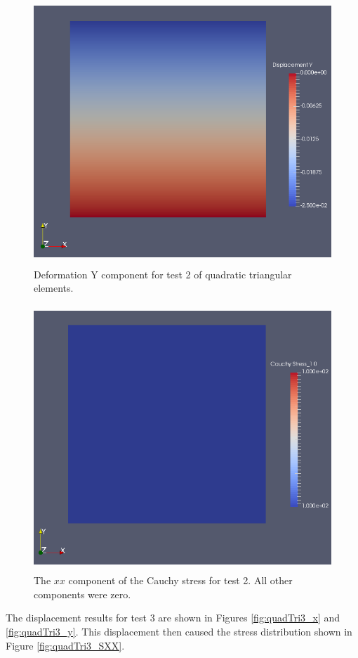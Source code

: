 \documentclass[a4paper, 12pt]{article}
\begin{document}
\begin{figure}[H]
  \centering
  \includegraphics[width=13cm, height=10cm]{Qtri_4_t2_disp_Y}
  \caption{Deformation Y component for test 2 of quadratic
            triangular elements.}
  \label{fig:quadTri2_y}
\end{figure}

\begin{figure}[H]
  \centering
  \includegraphics[width=13cm, height=10cm]{Qtri_4_t2_Sxx}
  \caption{The $xx$ component of the Cauchy stress for test 2.
            All other components were zero.}
  \label{fig:quadTri2_SXX}
\end{figure}

The displacement results for test 3 are shown in 
Figures \ref{fig:quadTri3_x} and \ref{fig:quadTri3_y}.
This displacement then caused the stress distribution 
shown in Figure \ref{fig:quadTri3_SXX}.
\end{document}
